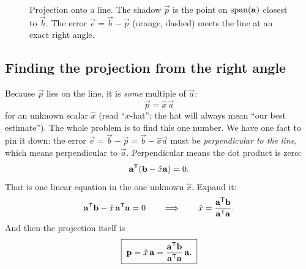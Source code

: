 \begin{figure}[H]
\centering
{}
\caption{Projection onto a line. The shadow $\vec{p}$ is the point on $\operatorname{span}(\mathbf{a})$ closest to
$\vec{b}$. The error $\vec{e}=\vec{b}-\vec{p}$ (orange, dashed) meets the line at an exact right angle.}
\label{ch18:project-line}
\end{figure}

\subsection{Finding the projection from the right angle}

Because $\vec{p}$ lies on the line, it is \emph{some} multiple of $\vec{a}$:
\[
  \vec{p} = \hat{x}\,\vec{a}
\]
for an unknown scalar $\hat{x}$ (read ``$x$-hat''; the hat will always mean ``our best estimate'').
The whole problem is to find this one number. We have one fact to pin it down: the error
$\vec{e} = \vec{b} - \vec{p} = \vec{b} - \hat{x}\vec{a}$ must be \emph{perpendicular to the line},
which means perpendicular to $\vec{a}$. Perpendicular means the dot product is zero:
\[
  \mathbf{a}^{\mathsf{T}}(\mathbf{b} - \hat{x}\mathbf{a}) = 0.
\]
That is one linear equation in the one unknown $\hat{x}$. Expand it:
\[
  \mathbf{a}^{\mathsf{T}}\mathbf{b} - \hat{x}\,\mathbf{a}^{\mathsf{T}}\mathbf{a} = 0
  \qquad\Longrightarrow\qquad
  \hat{x} = \frac{\mathbf{a}^{\mathsf{T}}\mathbf{b}}{\mathbf{a}^{\mathsf{T}}\mathbf{a}}.
\]
And then the projection itself is
\[
  \boxed{\;\mathbf{p} = \hat{x}\,\mathbf{a} = \frac{\mathbf{a}^{\mathsf{T}}\mathbf{b}}{\mathbf{a}^{\mathsf{T}}\mathbf{a}}\,\mathbf{a}.\;}
\]


